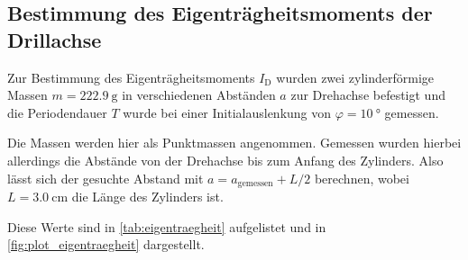\subsection{Bestimmung des Eigenträgheitsmoments der Drillachse}
\label{sec:eigentraegheit}

Zur Bestimmung des Eigenträgheitsmoments $I_\text{D}$ wurden zwei zylinderförmige Massen $m=\SI{222.9}{\gram}$ in verschiedenen Abständen $a$ zur Drehachse befestigt und die Periodendauer $T$ wurde bei einer Initialauslenkung von $\varphi=\SI{10}{\degree}$ gemessen.

Die Massen werden hier als Punktmassen angenommen. Gemessen wurden hierbei allerdings die Abstände von der Drehachse bis zum Anfang des Zylinders. Also lässt sich der gesuchte Abstand mit $a=a_\text{gemessen} + L/2$ berechnen, wobei $L=\SI{3.0}{\centi\meter}$ die Länge des Zylinders ist.

Diese Werte sind in \autoref{tab:eigentraegheit} aufgelistet und in \autoref{fig:plot_eigentraegheit} dargestellt.

